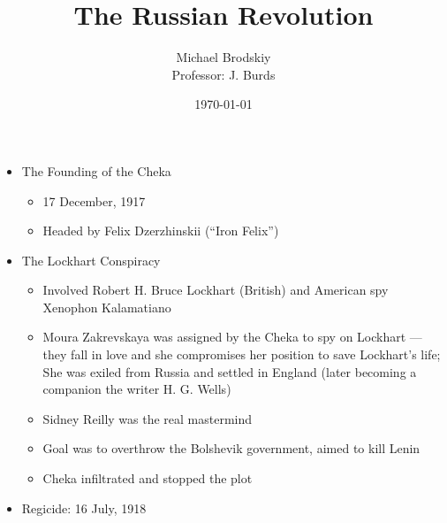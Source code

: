 

\title{The Russian Revolution}
\date{\today}
\author{Michael Brodskiy\\ \small Professor: J. Burds}



\maketitle

\begin{itemize}

  \item The Founding of the Cheka

    \begin{itemize}

      \item 17 December, 1917

      \item Headed by Felix Dzerzhinskii (``Iron Felix'')

    \end{itemize}

  \item The Lockhart Conspiracy

    \begin{itemize}

      \item Involved Robert H. Bruce Lockhart (British) and American spy Xenophon Kalamatiano

      \item Moura Zakrevskaya was assigned by the Cheka to spy on Lockhart — they fall in love and she compromises her position to save Lockhart's life; She was exiled from Russia and settled in England (later becoming a companion the writer H. G. Wells)

      \item Sidney Reilly was the real mastermind

      \item Goal was to overthrow the Bolshevik government, aimed to kill Lenin

      \item Cheka infiltrated and stopped the plot

    \end{itemize}

  \item Regicide: 16 July, 1918

    \begin{itemize}


\end{itemize}
\end{itemize}
